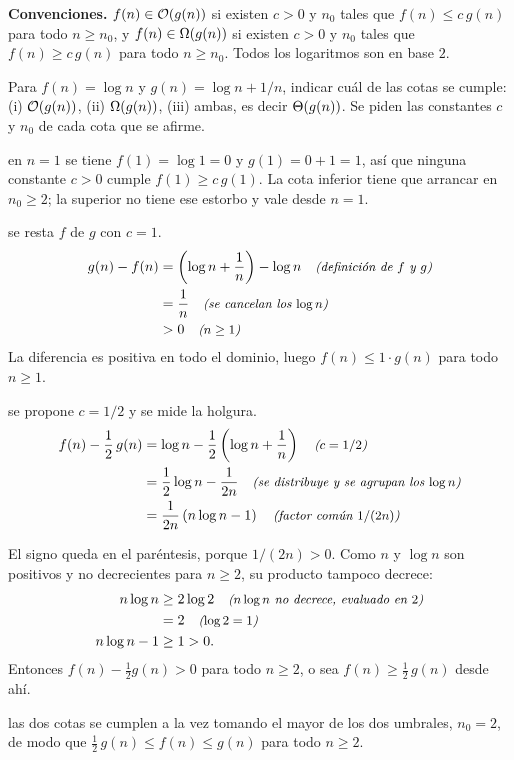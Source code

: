 \documentclass[11pt,letterpaper]{article}
\begin{document}

\noindent\textbf{Convenciones.}
$f(n) \in \mathcal{O}\!\left(g(n)\right)$ si existen $c > 0$ y $n_0$ tales que
$f(n) \le c\,g(n)$ para todo $n \ge n_0$, y
$f(n) \in \Omega\!\left(g(n)\right)$ si existen $c > 0$ y $n_0$ tales que
$f(n) \ge c\,g(n)$ para todo $n \ge n_0$. Todos los logaritmos son en base $2$.

\noindent Para $f(n) = \log n$ y $g(n) = \log n + 1/n$, indicar cuál de
las cotas se cumple: (i) $\mathcal{O}\!\left(g(n)\right)$, (ii) $\Omega\!\left(g(n)\right)$, (iii) ambas,
es decir $\Theta\!\left(g(n)\right)$. Se piden las constantes $c$ y $n_0$ de cada cota
que se afirme.

 en $n = 1$ se tiene $f(1) = \log 1 = 0$ y
$g(1) = 0 + 1 = 1$, así que ninguna constante $c > 0$ cumple
$f(1) \ge c\,g(1)$. La cota inferior tiene que arrancar en $n_0 \ge 2$;
la superior no tiene ese estorbo y vale desde $n = 1$.

 se resta $f$ de $g$ con $c = 1$.
\begin{align*}
  g(n) - f(n)
    &= \left(\log n + \frac{1}{n}\right) - \log n
       \quad\text{\small\itshape (definición de $f$ y $g$)} \\
    &= \frac{1}{n} \quad\text{\small\itshape (se cancelan los $\log n$)} \\
    &> 0 \quad\text{\small\itshape ($n \ge 1$)}
\end{align*}
La diferencia es positiva en todo el dominio, luego
$f(n) \le 1 \cdot g(n)$ para todo $n \ge 1$.

 se propone $c = 1/2$ y se mide la holgura.
\begin{align*}
  f(n) - \frac{1}{2}\,g(n)
    &= \log n - \frac{1}{2}\left(\log n + \frac{1}{n}\right)
       \quad\text{\small\itshape ($c = 1/2$)} \\
    &= \frac{1}{2}\log n - \frac{1}{2n}
       \quad\text{\small\itshape (se distribuye y se agrupan los $\log n$)} \\
    &= \frac{1}{2n}\left(n \log n - 1\right)
       \quad\text{\small\itshape (factor común $1/(2n)$)}
\end{align*}

El signo queda en el paréntesis, porque $1/(2n) > 0$. Como $n$ y
$\log n$ son positivos y no decrecientes para $n \ge 2$, su producto
tampoco decrece:
\begin{align*}
  n \log n &\ge 2 \log 2 \quad\text{\small\itshape ($n \log n$ no decrece, evaluado en $2$)} \\
           &= 2 \quad\text{\small\itshape ($\log 2 = 1$)} \\
  n \log n - 1 &\ge 1 > 0.
\end{align*}
Entonces $f(n) - \tfrac{1}{2} g(n) > 0$ para todo $n \ge 2$, o sea
$f(n) \ge \tfrac{1}{2}\,g(n)$ desde ahí.

 las dos cotas se cumplen a la vez tomando el mayor
de los dos umbrales, $n_0 = 2$, de modo que
$\tfrac{1}{2}\,g(n) \le f(n) \le g(n)$ para todo $n \ge 2$.
\end{document}
